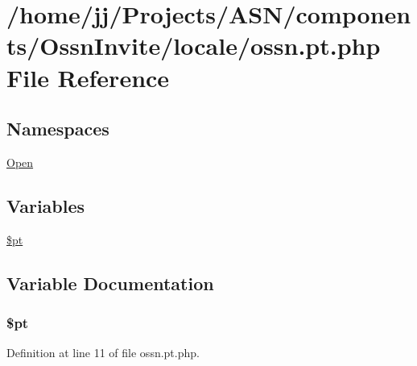 \hypertarget{components_2_ossn_invite_2locale_2ossn_8pt_8php}{}\section{/home/jj/\+Projects/\+A\+S\+N/components/\+Ossn\+Invite/locale/ossn.pt.\+php File Reference}
\label{components_2_ossn_invite_2locale_2ossn_8pt_8php}
\subsection*{Namespaces}
\begin{DoxyCompactItemize}
\item 
 \hyperlink{namespace_open}{Open}
\end{DoxyCompactItemize}
\subsection*{Variables}
\begin{DoxyCompactItemize}
\item 
\hyperlink{components_2_ossn_invite_2locale_2ossn_8pt_8php_a62c150775a7a00e8663463c638016cad}{\$pt}
\end{DoxyCompactItemize}


\subsection{Variable Documentation}
\subsubsection[{\texorpdfstring{\$pt}{$pt}}]{\setlength{\rightskip}{0pt plus 5cm}\$pt}\hypertarget{components_2_ossn_invite_2locale_2ossn_8pt_8php_a62c150775a7a00e8663463c638016cad}{}\label{components_2_ossn_invite_2locale_2ossn_8pt_8php_a62c150775a7a00e8663463c638016cad}


Definition at line 11 of file ossn.\+pt.\+php.

